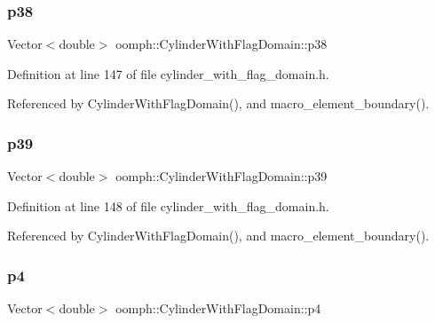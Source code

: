 \subsubsection{\texorpdfstring{p38}{p38}}
{\footnotesize\ttfamily Vector$<$double$>$ oomph\+::\+Cylinder\+With\+Flag\+Domain\+::p38\hspace{0.3cm}{\ttfamily [private]}}



Definition at line 147 of file cylinder\+\_\+with\+\_\+flag\+\_\+domain.\+h.



Referenced by Cylinder\+With\+Flag\+Domain(), and macro\+\_\+element\+\_\+boundary().

\mbox{\label{classoomph_1_1CylinderWithFlagDomain_a0b6726667f09eeabad0885858e684ff0}} 
\subsubsection{\texorpdfstring{p39}{p39}}
{\footnotesize\ttfamily Vector$<$double$>$ oomph\+::\+Cylinder\+With\+Flag\+Domain\+::p39\hspace{0.3cm}{\ttfamily [private]}}



Definition at line 148 of file cylinder\+\_\+with\+\_\+flag\+\_\+domain.\+h.



Referenced by Cylinder\+With\+Flag\+Domain(), and macro\+\_\+element\+\_\+boundary().

\mbox{\label{classoomph_1_1CylinderWithFlagDomain_a060890ea588f8e5833d518fa707fe774}} 
\subsubsection{\texorpdfstring{p4}{p4}}
{\footnotesize\ttfamily Vector$<$double$>$ oomph\+::\+Cylinder\+With\+Flag\+Domain\+::p4\hspace{0.3cm}{\ttfamily [private]}}



